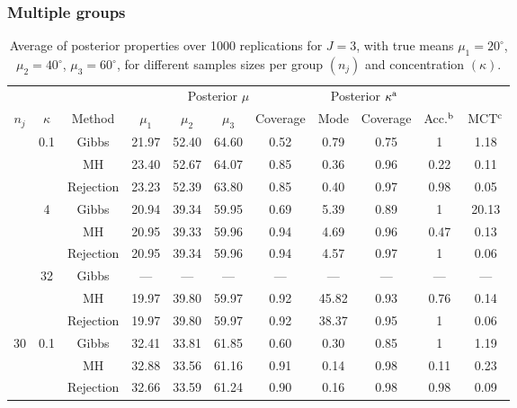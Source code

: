 \documentclass[]{gSCS2e}
\theoremstyle{plain}
\theoremstyle{definition}
\theoremstyle{remark}
\begin{document}
\subsubsection{Multiple groups}



\begin{table}
\centering
\begin{minipage}{.90\textwidth}
\caption{Average of posterior properties over 1000 replications for $J=3$, with true means $\mu_1 = 20^\circ$, $\mu_2 = 40^\circ$, $\mu_3 = 60^\circ$, for different samples sizes per group $(n_j)$ and concentration $(\kappa)$.}
\label{J3}

{\footnotesize
\begin{tabular}{ccccccccccc}
  \toprule 
 &&& \multicolumn{4}{c}{Posterior $\mu$} & \multicolumn{2}{c}{Posterior $\kappa^{\rm a}$}&  \\
   $n_j$ & $\kappa$ & Method & $\mu_1$ & $\mu_2$ & $\mu_3$ & Coverage & Mode & Coverage  & Acc.$^{\rm b}$ & MCT$^{\rm c}$  \\
 \colrule
 5 & 0.1 & Gibbs & 21.97 & 52.40 & 64.60 & 0.52 & 0.79 & 0.75 & 1 & 1.18 \\ 
   &  & MH & 23.40 & 52.67 & 64.07 & 0.85 & 0.36 & 0.96 & 0.22 & 0.11 \\ 
   \vspace{0.2cm} &  & Rejection & 23.23 & 52.39 & 63.80 & 0.85 & 0.40 & 0.97 & 0.98 & 0.05 \\ 
   & 4 & Gibbs & 20.94 & 39.34 & 59.95 & 0.69 & 5.39 & 0.89 & 1 & 20.13 \\ 
   &  & MH & 20.95 & 39.33 & 59.96 & 0.94 & 4.69 & 0.96 & 0.47 & 0.13 \\ 
   \vspace{0.2cm} &  & Rejection & 20.95 & 39.34 & 59.96 & 0.94 & 4.57 & 0.97 & 1 & 0.06 \\ 
   & 32 & Gibbs & --- & --- & --- & --- & --- & --- & --- & --- \\ 
   &  & MH & 19.97 & 39.80 & 59.97 & 0.92 & 45.82 & 0.93 & 0.76 & 0.14 \\ 
   &  & Rejection & 19.97 & 39.80 & 59.97 & 0.92 & 38.37 & 0.95 & 1 & 0.06 \\ 
   \cmidrule{1-11} 
 30 & 0.1 & Gibbs & 32.41 & 33.81 & 61.85 & 0.60 & 0.30 & 0.85 & 1 & 1.19 \\ 
   &  & MH & 32.88 & 33.56 & 61.16 & 0.91 & 0.14 & 0.98 & 0.11 & 0.23 \\ 
   \vspace{0.2cm} &  & Rejection & 32.66 & 33.59 & 61.24 & 0.90 & 0.16 & 0.98 & 0.98 & 0.09 \\ 

\end{tabular}}
\end{minipage}
\end{table}
\end{document}
